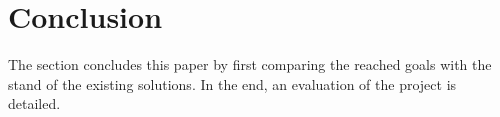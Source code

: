 \section{Conclusion}
The section concludes this paper by first comparing the reached goals with the stand of the existing solutions. In the end, an evaluation of the project is detailed. 

